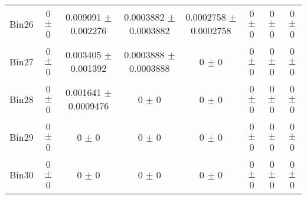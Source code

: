 \begin{tabular}{@{\extracolsep{4pt}}lccccccc@{}}
     Bin26 & 0 $\pm$ 0 & 0.009091 $\pm$ 0.002276 & 0.0003882 $\pm$ 0.0003882 & 0.0002758 $\pm$ 0.0002758 & 0 $\pm$ 0 & 0 $\pm$ 0 & 0 $\pm$ 0 \\ 
     Bin27 & 0 $\pm$ 0 & 0.003405 $\pm$ 0.001392 & 0.0003888 $\pm$ 0.0003888 & 0 $\pm$ 0 & 0 $\pm$ 0 & 0 $\pm$ 0 & 0 $\pm$ 0 \\ 
     Bin28 & 0 $\pm$ 0 & 0.001641 $\pm$ 0.0009476 & 0 $\pm$ 0 & 0 $\pm$ 0 & 0 $\pm$ 0 & 0 $\pm$ 0 & 0 $\pm$ 0 \\ 
     Bin29 & 0 $\pm$ 0 & 0 $\pm$ 0 & 0 $\pm$ 0 & 0 $\pm$ 0 & 0 $\pm$ 0 & 0 $\pm$ 0 & 0 $\pm$ 0 \\ 
     Bin30 & 0 $\pm$ 0 & 0 $\pm$ 0 & 0 $\pm$ 0 & 0 $\pm$ 0 & 0 $\pm$ 0 & 0 $\pm$ 0 & 0 $\pm$ 0 \\ 
\hline\hline
  \end{tabular}

